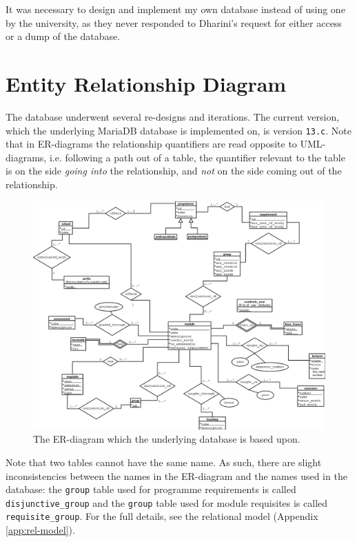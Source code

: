 It was necessary to design and implement my own database instead of using one
by the university, as they never responded to Dharini's request for either
access or a dump of the database.

\section{Entity Relationship Diagram}
The database underwent several re-designs and iterations. The current version,
which the underlying MariaDB database is implemented on, is version
\texttt{13.c}. Note that in ER-diagrams the relationship quantifiers are read
opposite to UML-diagrams, i.e. following a path out of a table, the quantifier
relevant to the table is on the side \textit{going into} the relationship, and
\textit{not} on the side coming out of the relationship.
\begin{figure}[H]
    \centering
    \includegraphics[width=\linewidth]{../Database/ER-Diagram-LATEST.png}
    \caption{The ER-diagram which the underlying database is based upon.}
\end{figure}
Note that two tables cannot have the same name. As such, there are slight
inconsistencies between the names in the ER-diagram and the names used in the
database: the \texttt{group} table used for programme requirements is called
\texttt{disjunctive\_group} and the \texttt{group} table used for module
requisites is called \texttt{requisite\_group}. For the full details, see the
relational model (Appendix \ref{app:rel-model}).

